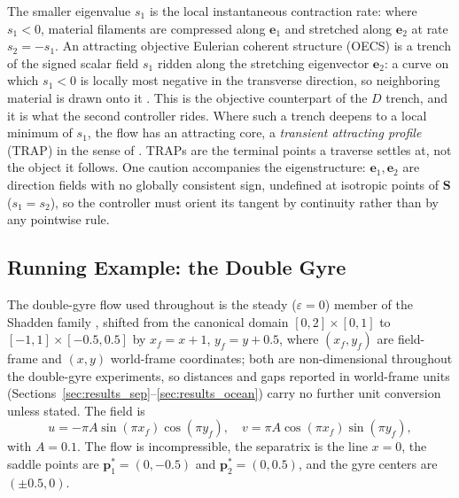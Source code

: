 \documentclass[lettersize,journal]{IEEEtran}
\begin{document}
The smaller eigenvalue $s_1$ is the local instantaneous contraction
rate: where $s_1 < 0$, material filaments are compressed along
$\mathbf{e}_1$ and stretched along $\mathbf{e}_2$ at rate $s_2 = -s_1$.
An attracting objective Eulerian coherent structure (OECS) is a trench
of the signed scalar field $s_1$ ridden along the stretching eigenvector
$\mathbf{e}_2$: a curve on which $s_1 < 0$ is locally most negative in
the transverse direction, so neighboring material is drawn onto it
\cite{17}. This is the objective counterpart of the $D$ trench, and it
is what the second controller rides. Where such a trench deepens to a
local minimum of $s_1$, the flow has an attracting core, a
\emph{transient attracting profile} (TRAP) in the sense of \cite{36}.
TRAPs are the terminal points a traverse settles at, not the object it
follows. One caution accompanies
the eigenstructure: $\mathbf{e}_1, \mathbf{e}_2$ are direction fields
with no globally consistent sign, undefined at isotropic points of
$\mathbf{S}$ ($s_1 = s_2$), so the controller must orient its tangent by
continuity rather than by any pointwise rule.

\subsection{Running Example: the Double Gyre}
\label{sec:dg_example}

The double-gyre flow used throughout is the steady ($\varepsilon = 0$)
member of the Shadden family \cite{8}, shifted from the canonical domain
$[0,2] \times [0,1]$ to $[-1,1] \times [-0.5, 0.5]$ by
$x_f = x + 1$, $y_f = y + 0.5$, where $(x_f, y_f)$ are field-frame and
$(x, y)$ world-frame coordinates; both are non-dimensional throughout the
double-gyre experiments, so distances and gaps reported in world-frame
units (Sections~\ref{sec:results_sep}--\ref{sec:results_ocean}) carry no
further unit conversion unless stated. The field is
\begin{equation}
    u = -\pi A \sin(\pi x_f) \cos(\pi y_f), \quad
    v = \pi A \cos(\pi x_f) \sin(\pi y_f),
    \label{eq:dg_u}
\end{equation}
with $A = 0.1$. The flow is incompressible, the separatrix is the line
$x = 0$, the saddle points are $\mathbf{p}^*_1 = (0, -0.5)$ and
$\mathbf{p}^*_2 = (0, 0.5)$, and the gyre centers are $(\pm 0.5, 0)$.
\end{document}
